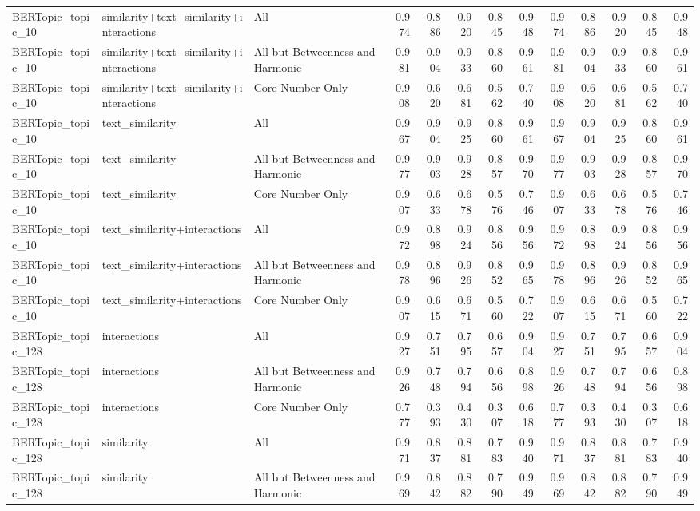 \begin{tabular}{lllrrrrrrrrrr}
BERTopic\_topic\_10 & similarity+text\_similarity+interactions & All & 0.974 & 0.886 & 0.920 & 0.845 & 0.948 & 0.974 & 0.886 & 0.920 & 0.845 & 0.948 \\
BERTopic\_topic\_10 & similarity+text\_similarity+interactions & All but Betweenness and Harmonic & 0.981 & 0.904 & 0.933 & 0.860 & 0.961 & 0.981 & 0.904 & 0.933 & 0.860 & 0.961 \\
BERTopic\_topic\_10 & similarity+text\_similarity+interactions & Core Number Only & 0.908 & 0.620 & 0.681 & 0.562 & 0.740 & 0.908 & 0.620 & 0.681 & 0.562 & 0.740 \\
BERTopic\_topic\_10 & text\_similarity & All & 0.967 & 0.904 & 0.925 & 0.860 & 0.961 & 0.967 & 0.904 & 0.925 & 0.860 & 0.961 \\
BERTopic\_topic\_10 & text\_similarity & All but Betweenness and Harmonic & 0.977 & 0.903 & 0.928 & 0.857 & 0.970 & 0.977 & 0.903 & 0.928 & 0.857 & 0.970 \\
BERTopic\_topic\_10 & text\_similarity & Core Number Only & 0.907 & 0.633 & 0.678 & 0.576 & 0.746 & 0.907 & 0.633 & 0.678 & 0.576 & 0.746 \\
BERTopic\_topic\_10 & text\_similarity+interactions & All & 0.972 & 0.898 & 0.924 & 0.856 & 0.956 & 0.972 & 0.898 & 0.924 & 0.856 & 0.956 \\
BERTopic\_topic\_10 & text\_similarity+interactions & All but Betweenness and Harmonic & 0.978 & 0.896 & 0.926 & 0.852 & 0.965 & 0.978 & 0.896 & 0.926 & 0.852 & 0.965 \\
BERTopic\_topic\_10 & text\_similarity+interactions & Core Number Only & 0.907 & 0.615 & 0.671 & 0.560 & 0.722 & 0.907 & 0.615 & 0.671 & 0.560 & 0.722 \\
BERTopic\_topic\_128 & interactions & All & 0.927 & 0.751 & 0.795 & 0.657 & 0.904 & 0.927 & 0.751 & 0.795 & 0.657 & 0.904 \\
BERTopic\_topic\_128 & interactions & All but Betweenness and Harmonic & 0.926 & 0.748 & 0.794 & 0.656 & 0.898 & 0.926 & 0.748 & 0.794 & 0.656 & 0.898 \\
BERTopic\_topic\_128 & interactions & Core Number Only & 0.777 & 0.393 & 0.430 & 0.307 & 0.618 & 0.777 & 0.393 & 0.430 & 0.307 & 0.618 \\
BERTopic\_topic\_128 & similarity & All & 0.971 & 0.837 & 0.881 & 0.783 & 0.940 & 0.971 & 0.837 & 0.881 & 0.783 & 0.940 \\
BERTopic\_topic\_128 & similarity & All but Betweenness and Harmonic & 0.969 & 0.842 & 0.882 & 0.790 & 0.949 & 0.969 & 0.842 & 0.882 & 0.790 & 0.949 \\

\end{tabular}
